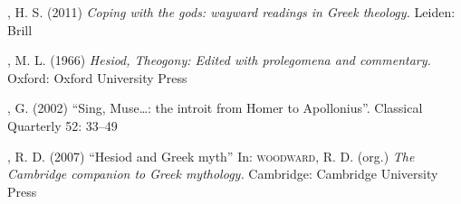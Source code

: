 \begin{bibliohedra}
, H. S. (2011) \textit{Coping with the gods: wayward readings in
Greek theology.} Leiden: Brill
  
, M. L. (1966) \textit{Hesiod, Theogony: Edited with prolegomena and
commentary.} Oxford: Oxford University Press
  
, G. (2002) “Sing, Muse\ldots{}: the introit from Homer to Apollonius”.
Classical Quarterly 52: 33--49
  
, R. D. (2007) “Hesiod and Greek myth” In: \textsc{woodward}, R.
D. (org.) \textit{The Cambridge companion to Greek mythology.} Cambridge:
Cambridge University Press
  
\end{bibliohedra}

